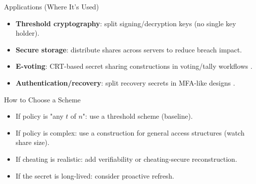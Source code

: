 \begin{frame}{Applications (Where It's Used)}
	\begin{itemize}
		\item \textbf{Threshold cryptography}: split signing/decryption keys (no single key holder).
		\item \textbf{Secure storage}: distribute shares across servers to reduce breach impact.
		\item \textbf{E-voting}: CRT-based secret sharing constructions in voting/tally workflows \cite{iftene2007general}.
		\item \textbf{Authentication/recovery}: split recovery secrets in MFA-like designs \cite{ometov2018multi}.
	\end{itemize}
\end{frame}

\begin{frame}{How to Choose a Scheme}
	\begin{itemize}
		\item If policy is "any \(t\) of \(n\)": use a threshold scheme (baseline).
		\item If policy is complex: use a construction for general access structures (watch share size).
		\item If cheating is realistic: add verifiability or cheating-secure reconstruction.
		\item If the secret is long-lived: consider proactive refresh.
	\end{itemize}

\end{frame}
